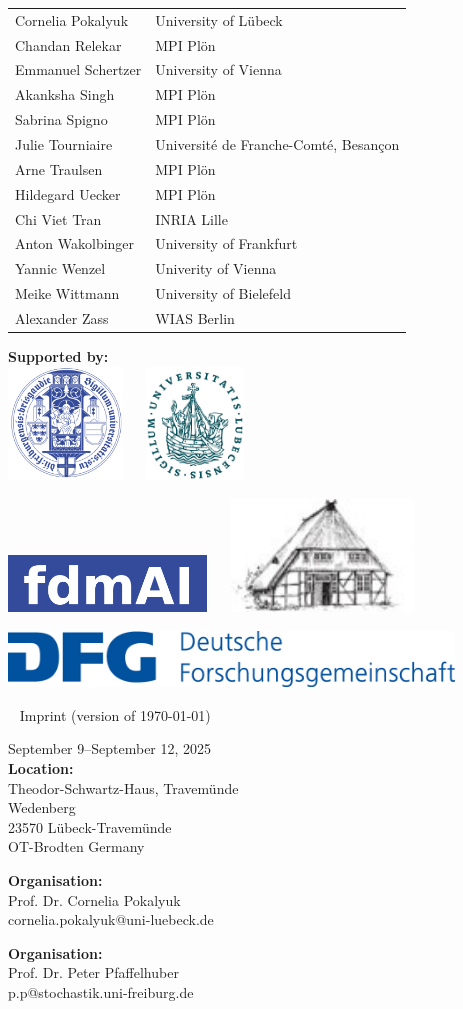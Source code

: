 \documentclass[12pt,a4paper]{article}
\makeatletter
\newcommand{\Impressum}{%
{\scriptsize
\fboxsep0pt
{\begin{minipage}[b]{.4\textwidth}
September 9--September 12, 2025\\[.5ex]
\textbf{Location: }\\
Theodor-Schwartz-Haus, Travemünde\\
Wedenberg \\
23570 Lübeck-Travemünde \\ OT-Brodten
Germany
\end{minipage}}
\hfill
{\begin{minipage}[b]{.29\textwidth}
\textbf{Organisation: }\\
Prof. Dr. Cornelia Pokalyuk \\
cornelia.pokalyuk@uni-luebeck.de  
\end{minipage}}%
\hfill
{\begin{minipage}[b]{.29\textwidth}
\textbf{Organisation: }\\
Prof. Dr. Peter Pfaffelhuber\\
p.p@stochastik.uni-freiburg.de
\end{minipage}} 
}}
\makeatother
\begin{document}
\begin{longtable}{L{0.3\textwidth}R{0.7\textwidth}}
Cornelia Pokalyuk & University of Lübeck \\
Chandan Relekar & MPI Plön \\
Emmanuel Schertzer & University of Vienna \\
Akanksha Singh & MPI Plön \\
Sabrina Spigno & MPI Plön \\
Julie Tourniaire & Université de Franche-Comté, Besançon \\
Arne Traulsen & MPI Plön \\
Hildegard Uecker & MPI Plön \\
Chi Viet Tran & INRIA Lille \\
Anton Wakolbinger & University of Frankfurt \\
Yannic Wenzel & Univerity of Vienna \\
Meike Wittmann & University of Bielefeld \\
Alexander Zass & WIAS Berlin \\
\end{longtable}


\newpage


\textbf{Supported by: }\\
 
\includegraphics[height=3cm]{UFR-vorlage-designsystem-typo-farben-V1.99-768x543.png}
~\hfill ~
\includegraphics[height=3cm]{Siegel-Uni-Luebeck.svg.png}
~\hfill ~

\bigskip
\includegraphics[height=1.5cm]{fdmai.png}
~\hfill ~
\includegraphics[height=3cm]{logo-tsh.jpg}
~\hfill ~

\bigskip
\bigskip
\bigskip
\bigskip

\includegraphics[height=1.5cm]{dfg.jpg}

 ~
 \vfill
 {\scriptsize Imprint {\tiny (version of \today) }} \\[1ex]
 \Impressum
 
 \bigskip
\end{document}
